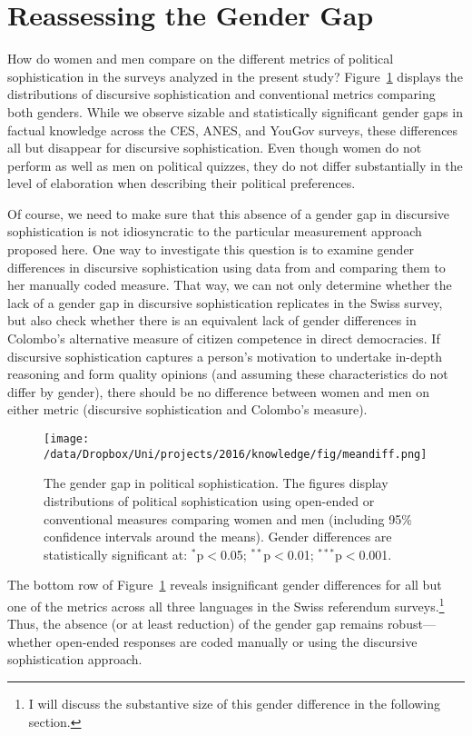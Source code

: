 \section*{Reassessing the Gender Gap}
How do women and men compare on the different metrics of political sophistication in the surveys analyzed in the present study? Figure~\ref{fig:meandiff} displays the distributions of discursive sophistication and conventional metrics comparing both genders. While we observe sizable and statistically significant gender gaps in factual knowledge across the CES, ANES, and YouGov surveys, these differences all but disappear for discursive sophistication. Even though women do not perform as well as men on political quizzes, they do not differ substantially in the level of elaboration when describing their political preferences.

Of course, we need to make sure that this absence of a gender gap in discursive sophistication is not idiosyncratic to the particular measurement approach proposed here. One way to investigate this question is to examine gender differences in discursive sophistication using data from \citet{colombo2016justifications} and comparing them to her manually coded measure. That way, we can not only determine whether the lack of a gender gap in discursive sophistication replicates in the Swiss survey, but also check whether there is an equivalent lack of gender differences in Colombo's alternative measure of citizen competence in direct democracies. If discursive sophistication captures a person's motivation to undertake in-depth reasoning and form quality opinions (and assuming these characteristics do not differ by gender), there should be no difference between women and men on either metric (discursive sophistication and Colombo's measure).

\begin{figure}[ht]\centering
	\texttt{[image: /data/Dropbox/Uni/projects/2016/knowledge/fig/meandiff.png]}
	\caption[The gender gap in political sophistication]{The gender gap in political sophistication. The figures display distributions of political sophistication using open-ended or conventional measures comparing women and men (including 95\% confidence intervals around the means). Gender differences are statistically significant at:  $^{*}$p$<$0.05; $^{**}$p$<$0.01; $^{***}$p$<$0.001.}\label{fig:meandiff}
\end{figure}

\clearpage

The bottom row of Figure~\ref{fig:meandiff} reveals insignificant gender differences for all but one of the metrics across all three languages in the Swiss referendum surveys.\footnote{I will discuss the substantive size of this gender difference in the following section.} Thus, the absence (or at least reduction) of the gender gap remains robust---whether open-ended responses are coded manually or using the discursive sophistication approach.

